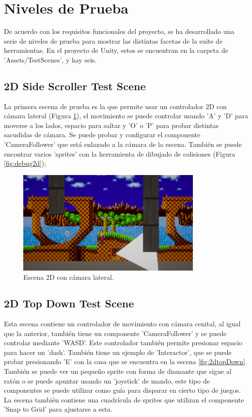\section{Niveles de Prueba}
De acuerdo con los requisitos funcionales del proyecto, se ha desarrollado una serie de niveles de prueba para mostrar las distintas facetas de la suite de herramientas. En el proyecto de Unity, estos se encuentran
en la carpeta de 'Assets/TestScenes', y hay seis.

\subsection{2D Side Scroller Test Scene}
La primera escena de prueba es la que permite usar un controlador 2D con cámara lateral (Figura \ref{fig:2dSideScroller}), el movimiento se puede controlar usando 'A' y 'D' para moverse a 
los lados, espacio para saltar y 'O' o 'P' para probar distintas sacudidas de cámara. Se puede probar y configurar el componente 'CameraFollower' que está 
enlazado a la cámara de la escena. También se puede encontrar varios 'sprites' con la herramienta de dibujado de colisiones (Figura \ref{fig:debug2d});

\begin{figure}[H]
   \centering
     \includegraphics[width=350px,clip=true]{2dSideScrollerTestScene.png}
   \caption{Escena 2D con cámara lateral.}
   \label{fig:2dSideScroller}
\end{figure}

\subsection{2D Top Down Test Scene}
Esta escena contiene un controlador de movimiento con cámara cenital, al igual que la anterior, también tiene un componente 'CameraFollower' y se puede
controlar mediante 'WASD'. Este controlador también permite presionar espacio para hacer un 'dash'. También tiene un ejemplo de 'Interactor', que se puede
 probar presionando 'E' con la casa que se encuentra en la escena \ref{fig:2dtopDown}. También se puede ver un pequeño sprite con forma de diamante que sigue 
 al ratón o se puede apuntar usando un 'joystick' de mando, este tipo de componentes se puede utilizar como guía para disparar en cierto tipo de juegos. La 
 escena también contiene una cuadrícula de sprites que utilizan el componente 'Snap to Grid' para ajustarse a esta.

